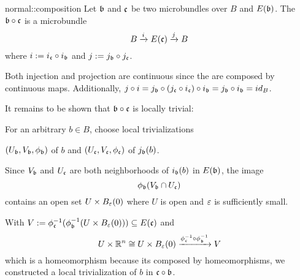 \begin{mydefinition}{normal::composition}
    Let $\bb$ and $\bc$ be two microbundles over $B$ and $E(\bb)$.
    The  $\bb \circ \bc$ is a microbundle
    \[ \bundle{B}{E(\bc)}{i}{j} \]
    where $i := i_\bc \circ i_\bb$ and $j := j_\bb \circ j_\bc$.
\end{mydefinition}

\begin{myproof}
    Both injection and projection are continuous since the are composed by continuous maps.
    Additionally, $j \circ i = j_\bb \circ (j_\bc \circ i_\bc) \circ i_\bb = j_\bb \circ i_\bb = id_B$.

    It remains to be shown that $\bb \circ \bc$ is locally trivial:

    For an arbitrary $b \in B$, choose local trivializations
    \begin{center}
        $(U_\bb, V_\bb, \phi_\bb)$ of $b$ and $(U_\bc, V_\bc, \phi_\bc)$ of $j_\bb(b)$.
    \end{center}
    Since $V_\bb$ and $U_\bc$ are both neighborhoods of $i_\bb(b)$ in $E(\bb)$, the image
    \[ \phi_\bb(V_\bb \cap U_\bc) \]
    contains an open set $U \times \ball[\eps]$ where $U$ is open and $\eps$ is sufficiently small.

    With $V := \phi_\bc^{-1}(\phi_\bb^{-1}(U \times \ball[\eps])) \sub E(\bc)$ and
    \[ U \times \R^n \cong U \times \ball[\eps] \xto{\inv{\phi_\bc} \circ \inv{\phi_\bb}} V \]
    which is a homeomorphism because its composed by homeomorphisms, we constructed a local trivialization of $b$ in $\bc \circ \bb$.
\end{myproof}